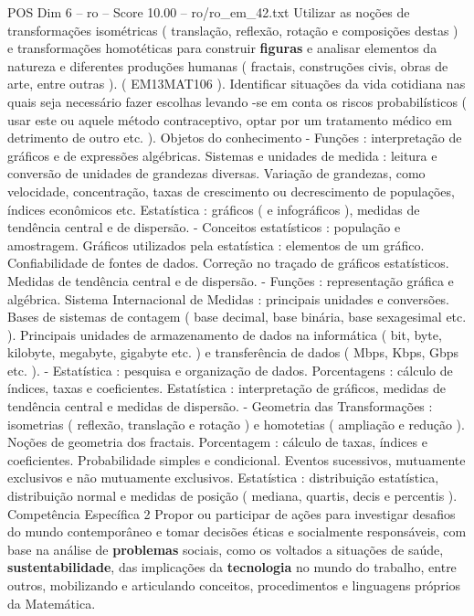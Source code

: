 \begin{textsample}{POS Dim 6 – ro – Score 10.00 – ro/ro\_em\_42.txt}
Utilizar as noções de transformações isométricas ( translação, reflexão, rotação e composições destas ) e transformações homotéticas para construir \textbf{figuras} e analisar elementos da natureza e diferentes produções humanas ( fractais, construções civis, obras de arte, entre outras ). ( EM13MAT106 ).
Identificar situações da vida cotidiana nas quais seja necessário fazer escolhas levando -se em conta os riscos probabilísticos ( usar este ou aquele método contraceptivo, optar por um tratamento médico em detrimento de outro etc. ).
Objetos do conhecimento - Funções : interpretação de gráficos e de expressões algébricas.
Sistemas e unidades de medida : leitura e conversão de unidades de grandezas diversas.
Variação de grandezas, como velocidade, concentração, taxas de crescimento ou decrescimento de populações, índices econômicos etc.
Estatística : gráficos ( e infográficos ), medidas de tendência central e de dispersão. - Conceitos estatísticos : população e amostragem.
Gráficos utilizados pela estatística : elementos de um gráfico.
Confiabilidade de fontes de dados.
Correção no traçado de gráficos estatísticos.
Medidas de tendência central e de dispersão. - Funções : representação gráfica e algébrica.
Sistema Internacional de Medidas : principais unidades e conversões.
Bases de sistemas de contagem ( base decimal, base binária, base sexagesimal etc. ).
Principais unidades de armazenamento de dados na informática ( bit, byte, kilobyte, megabyte, gigabyte etc. ) e transferência de dados ( Mbps, Kbps, Gbps etc. ). - Estatística : pesquisa e organização de dados.
Porcentagens : cálculo de índices, taxas e coeficientes.
Estatística : interpretação de gráficos, medidas de tendência central e medidas de dispersão. - Geometria das Transformações : isometrias ( reflexão, translação e rotação ) e homotetias ( ampliação e redução ).
Noções de geometria dos fractais.
Porcentagem : cálculo de taxas, índices e coeficientes.
Probabilidade simples e condicional.
Eventos sucessivos, mutuamente exclusivos e não mutuamente exclusivos.
Estatística : distribuição estatística, distribuição normal e medidas de posição ( mediana, quartis, decis e percentis ).
Competência Específica 2 Propor ou participar de ações para investigar desafios do mundo contemporâneo e tomar decisões éticas e socialmente responsáveis, com base na análise de \textbf{problemas} sociais, como os voltados a situações de saúde, \textbf{sustentabilidade}, das implicações da \textbf{tecnologia} no mundo do trabalho, entre outros, mobilizando e articulando conceitos, procedimentos e linguagens próprios da Matemática.

\end{textsample}

